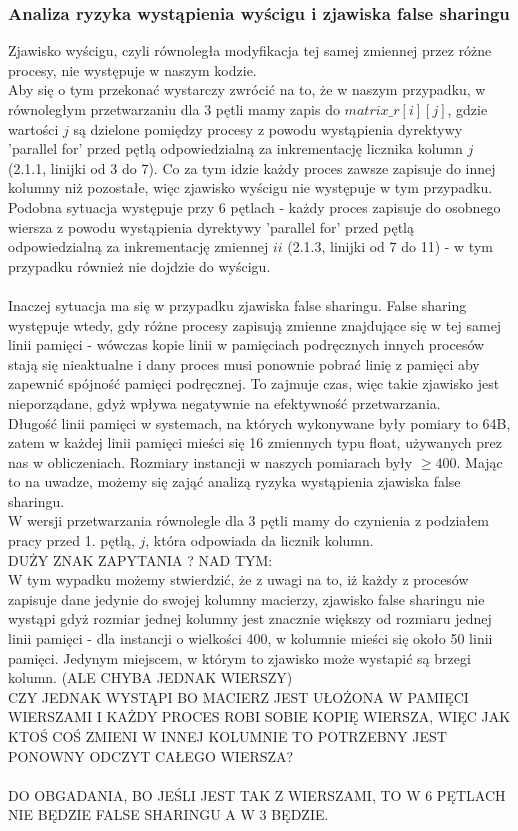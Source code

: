\documentclass[10pt,a4paper]{article}
\begin{document}
\subsubsection{Analiza ryzyka wystąpienia wyścigu i zjawiska false sharingu}
Zjawisko wyścigu, czyli równoległa modyfikacja tej samej zmiennej przez różne procesy, nie
występuje w naszym kodzie.\\
Aby się o tym przekonać wystarczy zwrócić na to, że w naszym przypadku,
w równoległym przetwarzaniu dla 3 pętli mamy zapis do $matrix\_r[i][j]$, gdzie wartości $j$ są
dzielone pomiędzy procesy z powodu wystąpienia dyrektywy 'parallel for' przed pętlą odpowiedzialną
za inkrementację licznika kolumn $j$ (2.1.1, linijki od 3 do 7). Co za tym idzie każdy proces zawsze zapisuje do innej kolumny
niż pozostałe, więc zjawisko wyścigu nie występuje w tym przypadku.\\
Podobna sytuacja występuje przy 6 pętlach - każdy proces zapisuje do osobnego wiersza z powodu
wystąpienia dyrektywy 'parallel for' przed pętlą odpowiedzialną za inkrementację zmiennej $ii$
(2.1.3, linijki od 7 do 11) - w tym przypadku również nie dojdzie do wyścigu.\\
\\
Inaczej sytuacja ma się w przypadku zjawiska false sharingu. False sharing występuje wtedy, gdy
różne procesy zapisują zmienne znajdujące się w tej samej linii pamięci - wówczas kopie linii
w pamięciach podręcznych innych procesów stają się nieaktualne i dany proces musi ponownie pobrać
linię z pamięci aby zapewnić spójność pamięci podręcznej. To zajmuje czas, więc takie zjawisko
jest nieporządane, gdyż wpływa negatywnie na efektywność przetwarzania.\\
Długość linii pamięci w systemach, na których wykonywane były pomiary to 64B, zatem w każdej
linii pamięci mieści się 16 zmiennych typu float, używanych prez nas w obliczeniach. Rozmiary
instancji w naszych pomiarach były $\geq 400$. Mając to na uwadze, możemy się zająć analizą ryzyka
wystąpienia zjawiska false sharingu.\\
W wersji przetwarzania równolegle dla 3 pętli mamy do czynienia z podziałem pracy przed 1. pętlą, $j$,
która odpowiada da licznik kolumn.\\
DUŻY ZNAK ZAPYTANIA ? NAD TYM:\\
W tym wypadku możemy stwierdzić, że z uwagi na to, iż każdy z procesów zapisuje dane
jedynie do swojej kolumny macierzy, zjawisko false sharingu nie wystąpi gdyż rozmiar jednej kolumny jest
znacznie większy od rozmiaru jednej linii pamięci - dla instancji o wielkości 400, w kolumnie
mieści się około 50 linii pamięci. Jedynym miejscem, w którym to zjawisko może wystapić są brzegi
kolumn. (ALE CHYBA JEDNAK WIERSZY)\\
CZY JEDNAK WYSTĄPI BO MACIERZ JEST UŁOŻONA W PAMIĘCI WIERSZAMI I KAŻDY PROCES ROBI SOBIE KOPIĘ
WIERSZA, WIĘC JAK KTOŚ COŚ ZMIENI W INNEJ KOLUMNIE TO POTRZEBNY JEST PONOWNY ODCZYT CAŁEGO WIERSZA?\\
\\
DO OBGADANIA, BO JEŚLI JEST TAK Z WIERSZAMI, TO W 6 PĘTLACH NIE BĘDZIE FALSE SHARINGU A W 3 BĘDZIE.
\\
\end{document}
